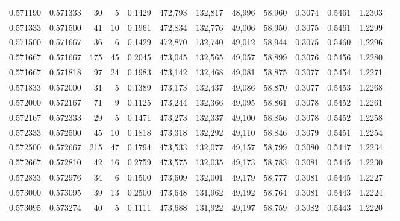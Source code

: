 \begin{tabular}{rrrrrrrrrrrrr}
0.571190 & 0.571333 &    30 &   5 &                                     0.1429 & 472,793 & 132,817 &  48,996 &  58,960 & 0.3074 & 0.5461 & 1.2303 \\
0.571333 & 0.571500 &    41 &  10 &                                     0.1961 & 472,834 & 132,776 &  49,006 &  58,950 & 0.3075 & 0.5461 & 1.2299 \\
0.571500 & 0.571667 &    36 &   6 &                                     0.1429 & 472,870 & 132,740 &  49,012 &  58,944 & 0.3075 & 0.5460 & 1.2296 \\
0.571667 & 0.571667 &   175 &  45 &                                     0.2045 & 473,045 & 132,565 &  49,057 &  58,899 & 0.3076 & 0.5456 & 1.2280 \\
0.571667 & 0.571818 &    97 &  24 &                                     0.1983 & 473,142 & 132,468 &  49,081 &  58,875 & 0.3077 & 0.5454 & 1.2271 \\
0.571833 & 0.572000 &    31 &   5 &                                     0.1389 & 473,173 & 132,437 &  49,086 &  58,870 & 0.3077 & 0.5453 & 1.2268 \\
0.572000 & 0.572167 &    71 &   9 &                                     0.1125 & 473,244 & 132,366 &  49,095 &  58,861 & 0.3078 & 0.5452 & 1.2261 \\
0.572167 & 0.572333 &    29 &   5 &                                     0.1471 & 473,273 & 132,337 &  49,100 &  58,856 & 0.3078 & 0.5452 & 1.2258 \\
0.572333 & 0.572500 &    45 &  10 &                                     0.1818 & 473,318 & 132,292 &  49,110 &  58,846 & 0.3079 & 0.5451 & 1.2254 \\
0.572500 & 0.572667 &   215 &  47 &                                     0.1794 & 473,533 & 132,077 &  49,157 &  58,799 & 0.3080 & 0.5447 & 1.2234 \\
0.572667 & 0.572810 &    42 &  16 &                                     0.2759 & 473,575 & 132,035 &  49,173 &  58,783 & 0.3081 & 0.5445 & 1.2230 \\
0.572833 & 0.572976 &    34 &   6 &                                     0.1500 & 473,609 & 132,001 &  49,179 &  58,777 & 0.3081 & 0.5445 & 1.2227 \\
0.573000 & 0.573095 &    39 &  13 &                                     0.2500 & 473,648 & 131,962 &  49,192 &  58,764 & 0.3081 & 0.5443 & 1.2224 \\
0.573095 & 0.573274 &    40 &   5 &                                     0.1111 & 473,688 & 131,922 &  49,197 &  58,759 & 0.3082 & 0.5443 & 1.2220 \\

\end{tabular}
